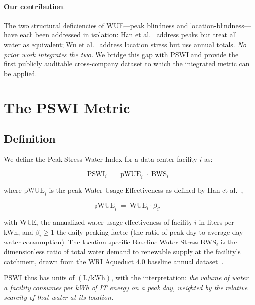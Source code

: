 \documentclass[conference,10pt]{IEEEtran}
\begin{document}
\paragraph{Our contribution.}
The two structural deficiencies of WUE---peak blindness and
location-blindness---have each been addressed in isolation: Han et
al.~\cite{han2026} address peaks but treat all water as equivalent; Wu
et al.~\cite{wu2025scarf} address location stress but use annual
totals. \emph{No prior work integrates the two.} We bridge this gap
with PSWI and provide the first publicly auditable cross-company
dataset to which the integrated metric can be applied.

\section{The PSWI Metric}
\label{sec:metric}

\subsection{Definition}

We define the Peak-Stress Water Index for a data center facility $i$ as:

\begin{equation}
\textrm{PSWI}_i \;=\; \textrm{pWUE}_i \;\cdot\; \textrm{BWS}_i
\label{eq:pswi}
\end{equation}

where $\textrm{pWUE}_i$ is the peak Water Usage Effectiveness as defined
by Han et al.~\cite{han2026},

\begin{equation}
\textrm{pWUE}_i \;=\; \textrm{WUE}_i \cdot \beta_i,
\label{eq:pwue}
\end{equation}

with $\textrm{WUE}_i$ the annualized water-usage effectiveness of
facility $i$ in liters per kWh, and $\beta_i \geq 1$ the daily peaking
factor (the ratio of peak-day to average-day water consumption). The
location-specific Baseline Water Stress $\textrm{BWS}_i$ is the
dimensionless ratio of total water demand to renewable supply at the
facility's catchment, drawn from the WRI Aqueduct 4.0 baseline annual
dataset~\cite{kuzma2023aqueduct}.

PSWI thus has units of $(\textrm{L}/\textrm{kWh})$, with the
interpretation: \emph{the volume of water a facility consumes per kWh
of IT energy on a peak day, weighted by the relative scarcity of that
water at its location.}
\end{document}
